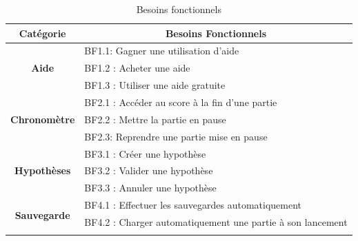 \documentclass{report}
\begin{document}
\begin{table}[H]
\centering
\caption{Besoins fonctionnels}
\label{table_besoins_fonctionnels}
\begin{tabular}{@{}cl@{}}
\toprule
\textbf{Catégorie}                                          & \multicolumn{1}{c}{\textbf{Besoins Fonctionnels}}                                             \\ \midrule
\multicolumn{1}{|c|}{\multirow{3}{*}{\textbf{Aide}}}        & \multicolumn{1}{l|}{BF1.1: Gagner une utilisation d'aide}                                     \\ \cmidrule(l){2-2} 
\multicolumn{1}{|c|}{}                                      & \multicolumn{1}{l|}{BF1.2 : Acheter une aide}                                       \\ \cmidrule(l){2-2} 
\multicolumn{1}{|c|}{}                                      & \multicolumn{1}{l|}{BF1.3 :  Utiliser une aide gratuite}                                                \\ \midrule
\multicolumn{1}{|c|}{\multirow{3}{*}{\textbf{Chronomètre}}} & \multicolumn{1}{l|}{BF2.1 :  Accéder au score à la fin d'une partie}                          \\ \cmidrule(l){2-2} 
\multicolumn{1}{|c|}{}                                      & \multicolumn{1}{l|}{BF2.2 : Mettre la partie en pause}                                        \\ \cmidrule(l){2-2} 
\multicolumn{1}{|c|}{}                                      & \multicolumn{1}{l|}{BF2.3: Reprendre une partie mise en pause}                                \\ \midrule
\multicolumn{1}{|c|}{\multirow{3}{*}{\textbf{Hypothèses}}}  & \multicolumn{1}{l|}{BF3.1 : Créer une hypothèse}                                              \\ \cmidrule(l){2-2} 
\multicolumn{1}{|c|}{}                                      & \multicolumn{1}{l|}{BF3.2 : Valider une hypothèse}                                            \\ \cmidrule(l){2-2} 
\multicolumn{1}{|c|}{}                                      & \multicolumn{1}{l|}{BF3.3 : Annuler une hypothèse}                                            \\ \midrule
\multicolumn{1}{|c|}{\multirow{3}{*}{\textbf{Sauvegarde}}}  & \multicolumn{1}{l|}{BF4.1 : Effectuer les sauvegardes automatiquement}                        \\ \cmidrule(l){2-2} 
\multicolumn{1}{|c|}{}                                      & \multicolumn{1}{l|}{BF4.2 : Charger automatiquement une partie à son lancement}               \\ \cmidrule(l){2-2} 

\end{tabular}
\end{table}
\end{document}

